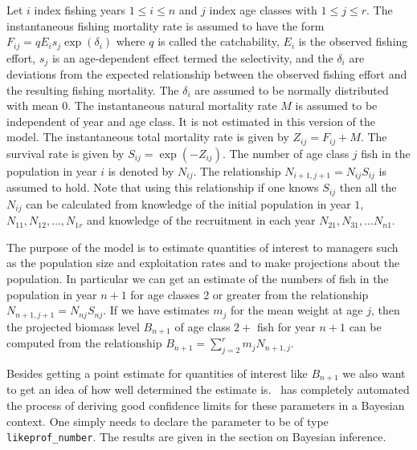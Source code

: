 \documentclass[12pt]{book}
\begin{document}
Let $i$ index fishing years $1\le i\le n$ and $j$ index age classes
with $1\le j\le r$.
The instantaneous fishing mortality rate is assumed to have the 
form $F_{ij}=qE_is_j\exp(\delta_i)$ where $q$ is called the catchability,
$E_i$ is the observed fishing effort, $s_j$ is an age-dependent effect
termed the selectivity, and the $\delta_i$ are deviations from the
expected relationship between the observed fishing effort and
the resulting fishing mortality. The $\delta_i$ are assumed to
be normally distributed with mean 0. The instantaneous
natural mortality rate $M$ is assumed to be independent of
year and age class. It is not estimated in this version of the model.
The instantaneous total
mortality rate is given by $Z_{ij}=F_{ij}+M$. The survival rate is given
by $S_{ij}=\exp(-Z_{ij})$. The number of age class $j$ fish
in the population in year $i$ is denoted by $N_{ij}$.
The relationship $N_{i+1,j+1}=N_{ij}S_{ij}$ is assumed to hold.
Note that using this relationship if one knows $S_{ij}$ then all
the $N_{ij}$ can be calculated from knowledge of the 
initial population in year $1$, $N_{11}, N_{12},\ldots, N_{1r}$
and knowledge of the recruitment in each year $N_{21}, N_{31},\ldots
N_{n1}$.

The purpose of the model is to estimate quantities of interest to
managers such as the population size and exploitation rates
and to make projections about the population. In particular we can get 
an estimate of the numbers of fish in the population in year $n+1$
for age classes 2 or greater from the relationship
$N_{n+1,j+1}=N_{nj}S_{nj}$. If we have estimates $m_j$ for the mean weight
at age $j$, then the projected biomass level $B_{n+1}$ of age class $2+$
fish for year $n+1$ can be computed from the relationship
$B_{n+1}=\sum_{j=2}^r m_jN_{n+1,j}$.

Besides getting a point estimate for quantities of interest like
$B_{n+1}$ we also want to get an idea of how well determined the
estimate is. \ADM\ has completely automated the process of deriving
good confidence limits for these parameters in a Bayesian context.
One simply needs to declare the parameter to be of type
{\tt likeprof\_number}. The  results are given in the section
on Bayesian inference.
\end{document}
